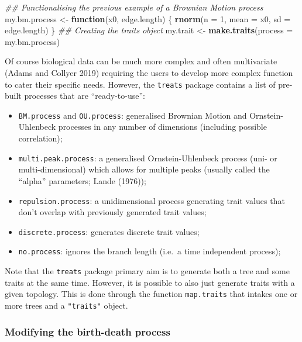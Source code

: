 \documentclass[
]{article}
\newenvironment{Shaded}{\begin{snugshade}}{\end{snugshade}}
\newcommand{\CommentTok}[1]{\textcolor[rgb]{0.56,0.35,0.01}{\textit{#1}}}
\newcommand{\ControlFlowTok}[1]{\textcolor[rgb]{0.13,0.29,0.53}{\textbf{#1}}}
\newcommand{\DataTypeTok}[1]{\textcolor[rgb]{0.13,0.29,0.53}{#1}}
\newcommand{\DecValTok}[1]{\textcolor[rgb]{0.00,0.00,0.81}{#1}}
\newcommand{\KeywordTok}[1]{\textcolor[rgb]{0.13,0.29,0.53}{\textbf{#1}}}
\newcommand{\NormalTok}[1]{#1}
\newcommand{\StringTok}[1]{\textcolor[rgb]{0.31,0.60,0.02}{#1}}
\providecommand{\tightlist}{%
  \setlength{\itemsep}{0pt}\setlength{\parskip}{0pt}}
\begin{document}
\begin{Shaded}
\begin{Highlighting}[]
\CommentTok{\#\# Functionalising the previous example of a Brownian Motion process}
\NormalTok{my.bm.process \textless{}{-}}\StringTok{ }\ControlFlowTok{function}\NormalTok{(x0, edge.length) \{}
    \KeywordTok{rnorm}\NormalTok{(}\DataTypeTok{n =} \DecValTok{1}\NormalTok{, }\DataTypeTok{mean =}\NormalTok{ x0, }\DataTypeTok{sd =}\NormalTok{ edge.length)}
\NormalTok{\} }
\CommentTok{\#\# Creating the traits object}
\NormalTok{my.trait \textless{}{-}}\StringTok{ }\KeywordTok{make.traits}\NormalTok{(}\DataTypeTok{process =}\NormalTok{ my.bm.process)}
\end{Highlighting}
\end{Shaded}

Of course biological data can be much more complex and often
multivariate (Adams and Collyer 2019) requiring the users to develop
more complex function to cater their specific needs. However, the
\texttt{treats} package contains a list of pre-built processes that are
``ready-to-use'':

\begin{itemize}
\tightlist
\item
  \texttt{BM.process} and \texttt{OU.process}: generalised Brownian
  Motion and Ornstein-Uhlenbeck processes in any number of dimensions
  (including possible correlation);
\item
  \texttt{multi.peak.process}: a generalised Ornstein-Uhlenbeck process
  (uni- or multi-dimensional) which allows for multiple peaks (usually
  called the ``alpha'' parameters; Lande (1976));
\item
  \texttt{repulsion.process}: a unidimensional process generating trait
  values that don't overlap with previously generated trait values;
\item
  \texttt{discrete.process}: generates discrete trait values;
\item
  \texttt{no.process}: ignores the branch length (i.e.~a time
  independent process);
\end{itemize}

Note that the \texttt{treats} package primary aim is to generate both a
tree and some traits at the same time. However, it is possible to also
just generate traits with a given topology. This is done through the
function \texttt{map.traits} that intakes one or more trees and a
\texttt{"traits"} object.

\hypertarget{modifying-the-birth-death-process}{%
\subsubsection{Modifying the birth-death
process}\label{modifying-the-birth-death-process}}
\end{document}
